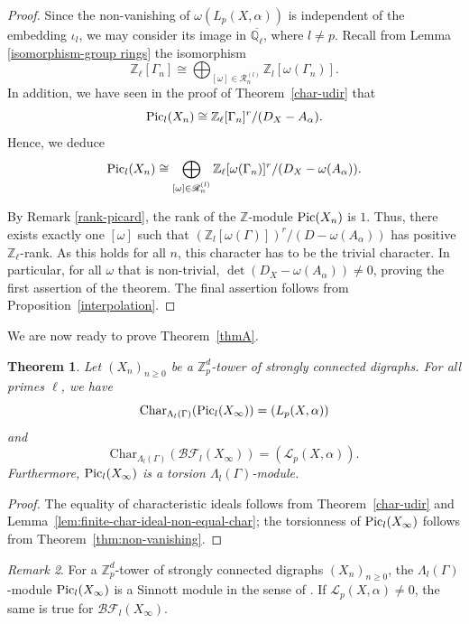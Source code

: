 \documentclass[11pt]{amsart}
\newtheorem{theorem}{Theorem}[section]
\numberwithin{equation}{section}
\theoremstyle{remark}
\newtheorem{remark}[theorem]{Remark}
\newcommand{\?}{\stackrel{?}{=}}
\newcommand{\cL}{\mathcal{L}}
\newcommand{\QQ}{\mathbb{Q}}
\newcommand{\ZZ}{\mathbb{Z}}
\newcommand{\Zp}{\mathbb{Z}_p}
\newcommand{\Z}{\mathbb{Z}}
\newcommand{\Char}{\mathrm{Char}}
\newcommand{\Pic}{\textup{Pic}}
\newcommand{\BF}{\mathcal{BF}}
\newcommand{\sR}{\mathscr{R}}
\newcommand{\Zl}{\ZZ_\ell}
\newcommand{\Ql}{\QQ_\ell}
\newcommand{\pic}{\textup{Pic}}
\begin{document}
\begin{proof}
Since the non-vanishing of $\omega(L_p(X,\alpha))$ is independent of the embedding $\iota_l$, we may consider its image in $\overline{\Ql}$, where  $l\ne p$.    Recall from Lemma \ref{isomorphism-group rings} the isomorphism
    \[\Zl[\Gamma_n]\cong \bigoplus_{[\omega]\in \sR_n^{(l)}}\Z_l[\omega(\Gamma_n)].\]
    In addition, we have seen in the proof of Theorem~\ref{char-udir} that $$\Pic_l(X_n)\cong\Zl[\Gamma_n]^r/(D_X-A_\alpha).$$
    Hence, we deduce 
    \[
    \Pic_l(X_n)\cong\bigoplus_{[\omega]\in\sR_n^{(l)}}\Zl[\omega(\Gamma_n)]^r/(D_X-\omega(A_\alpha)).
    \]
   

    
    By Remark \ref{rank-picard}, the rank of the $\ZZ$-module $\Pic(X_n)$ is $1$. Thus, there exists exactly one $[\omega]$ such that $(\Z_l[\omega(\Gamma)])^r/(D-\omega(A_\alpha))$ has positive $\Zl$-rank. As this holds for all $n$, this character has to be the trivial character. In particular, for all $\omega$ that is non-trivial, $\det(D_X-\omega(A_\alpha))\ne0$, proving the first assertion of the theorem. The final assertion follows from Proposition~\ref {interpolation}.
   \end{proof}
We are now ready to prove Theorem~\ref{thmA}.
\begin{theorem}Let $(X_n)_{n\ge0}$ be a $\Zp^d$-tower of strongly connected digraphs. For all primes $\ell$, we have
\label{thm:IMC}
   \[\Char_{\Lambda_l(\Gamma)}(\pic_l(X_\infty))=(L_p(X,\alpha))\]
   and
   \[\Char_{\Lambda_l(\Gamma)}(\BF_l(X_\infty))=(\cL_p(X,\alpha)).\]
   Furthermore, ${\rm Pic}_{l}(X_{\infty})$ is a torsion $\Lambda_l(\Gamma)$-module. 
\end{theorem}
\begin{proof}
The equality of characteristic ideals follows from Theorem~\ref{char-udir} and Lemma~\ref{lem:finite-char-ideal-non-equal-char}; the torsionness of $\Pic_l(X_\infty)$ follows from Theorem~\ref{thm:non-vanishing}.
\end{proof}
\begin{remark}\label{rk:sinnott}
    For a $\Zp^d$-tower of strongly connected digraphs $(X_n)_{n\ge0}$, the $\Lambda_l(\Gamma)$-module $\Pic_l(X_\infty)$ is a Sinnott module in the sense of \cite[Definition 4.6]{BandiniLonghi}. If $\cL_p(X,\alpha)\neq 0$, the same is true for $\BF_l(X_\infty)$. 
\end{remark}
\end{document}
